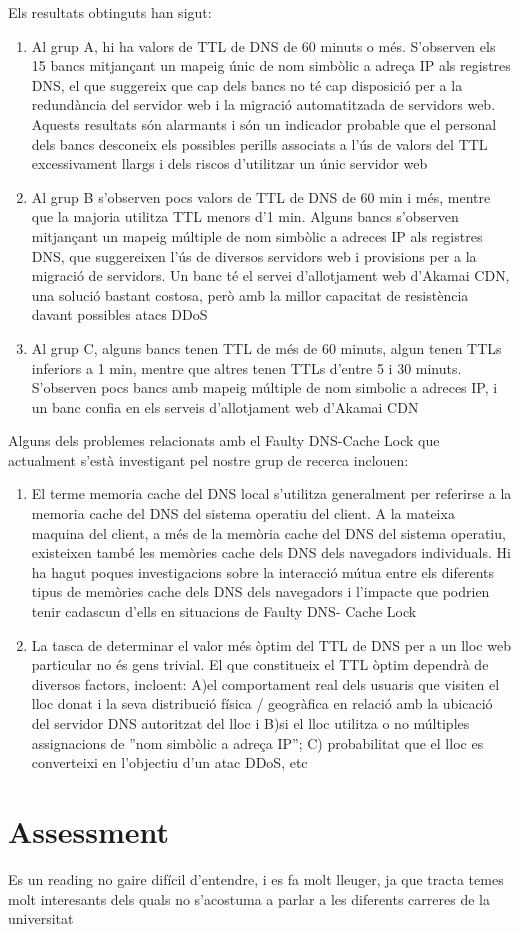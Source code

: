 \documentclass[a4paper, 10pt]{article}
\begin{document}
Els resultats obtinguts han sigut:
\begin{enumerate}
\item Al grup A, hi ha valors de TTL de DNS de 60 minuts o més. S’observen els 15 bancs mitjançant un mapeig únic de nom simbòlic a adreça IP als registres DNS, el que suggereix que cap dels bancs no té cap disposició per a la redundància del servidor web i la migració automatitzada de servidors web. Aquests resultats són alarmants i són un indicador probable que el personal dels bancs desconeix els possibles perills associats a l’ús de valors del TTL excessivament llargs i dels riscos d’utilitzar un únic servidor web

\item Al grup B s’observen pocs valors de TTL de DNS de 60 min i més, mentre que la majoria utilitza TTL menors d’1 min. Alguns bancs s’observen mitjançant un mapeig múltiple de nom simbòlic a adreces IP als registres DNS, que suggereixen l’ús de diversos servidors web i provisions per a la migració de servidors. Un banc té el servei d’allotjament web d’Akamai CDN, una solució bastant costosa, però amb la millor capacitat de resistència davant possibles atacs DDoS 
\item Al grup C, alguns bancs tenen TTL de més de 60 minuts, algun tenen TTLs inferiors a 1 min, mentre que altres tenen TTLs d’entre 5 i 30 minuts. S’observen pocs bancs amb mapeig múltiple de nom simbolic a adreces IP, i un banc confia en els serveis d’allotjament web d’Akamai CDN
\end{enumerate}
\newpage Alguns dels problemes relacionats amb el Faulty DNS-Cache Lock que actualment s’està investigant pel nostre grup de recerca inclouen:
\begin{enumerate}
\item El terme memoria cache del DNS local s’utilitza generalment per referirse a la memoria cache del DNS del sistema operatiu del client. A la mateixa maquina del client, a més de la memòria cache del DNS del sistema operatiu, existeixen també  les memòries cache dels DNS dels navegadors individuals. Hi ha hagut poques investigacions sobre la interacció mútua entre els diferents tipus de memòries cache dels DNS dels navegadors i l’impacte que podrien tenir cadascun d’ells en situacions de Faulty DNS- Cache Lock
\item La tasca de determinar el valor més òptim del TTL de DNS per a un lloc web particular no  és gens trivial. El que constitueix el TTL òptim dependrà de diversos factors, incloent: 
A)el comportament real dels usuaris que visiten el lloc donat i la seva distribució física / geogràfica en relació amb la ubicació del servidor DNS autoritzat del lloc i 
B)si el lloc utilitza o no múltiples assignacions de ”nom simbòlic a adreça IP”; 
C) probabilitat que el lloc es converteixi en l’objectiu d’un atac DDoS, etc
\end{enumerate}
\section{Assessment}

Es un reading no gaire difícil d'entendre, i es fa molt lleuger, ja que tracta temes molt interesants dels quals no s'acostuma a parlar a les diferents carreres de la universitat
\end{document}
